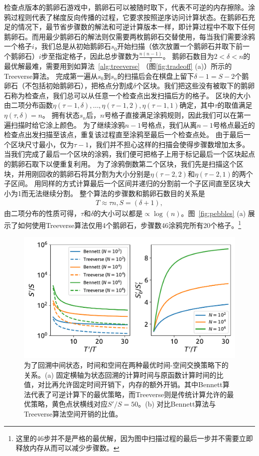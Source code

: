 \documentclass[A4,twoside,UTF8]{ctexart}
\begin{document}
检查点版本的鹅卵石游戏中，鹅卵石可以被随时取下，代表不可逆的内存擦除。涂鸦过程则代表了梯度反向传播的过程，它要求按照逆序访问计算状态。在鹅卵石充足的情况下，最节省步骤数的解法和可逆计算版本一样，即计算过程中不取下任何鹅卵石。而用最少鹅卵石的解法则仅需要两枚鹅卵石交替使用，每当我们需要涂鸦一个格子$i$，我们总是从初始鹅卵石$s_0$开始扫描（依次放置一个鹅卵石并取下前一个鹅卵石）$i$步至指定格子，因此总步骤数为$\frac{n(n-1)}{2}$。
鹅卵石数目为$2<\delta<n$的最优解最难，需要用到如算法~\ref{alg:treeverse} （图\ref{fig:tradeoff} (a)）所示的Treeverse算法。
完成第一遍从$s_0$到$s_{n}$的扫描后会在棋盘上留下$\delta-1=S-2$个鹅卵石（不包括初始鹅卵石），把格点分割成$\delta$个区块。我们把这些没有被取下的鹅卵石称为检查点，我们总可以从任意一个检查点出发扫描后方的格子。
区块的大小由二项分布函数$\eta(\tau-1, \delta), \ldots, \eta(\tau-1, 2), \eta(\tau-1, 1)$确定，其中$\tau$的取值满足$\eta(\tau, \delta) = n$。
拥有状态$s_{n}$后，$n$号格子直接满足涂鸦规则，因此我们可以在第一遍扫描时给它涂上颜色。
为了继续涂鸦$n-1$号格点，我们从离$n-1$号格点最近的检查点出发扫描至该点，重复该过程直至涂鸦至最后一个检查点处。
由于最后一个区块尺寸最小，仅为$\tau-1$，我们并不担心这样的扫描会使得步骤数增加太多。
当我们完成了最后一个区块的涂鸦，我们便可把格子上用于标记最后一个区块起点的鹅卵石取下以便重复利用。
为了涂鸦倒数第二个区块，我们先是扫描这个区块，并用刚回收的鹅卵石将其分割为大小分别是$\eta(\tau-2, 2)$和$\eta(\tau-2, 1)$的两个子区间。
用同样的方式计算最后一个区间并递归的分割前一个子区间直至区块大小为1而无法继续分割。
整个算法的步骤数和鹅卵石数目的关系是
\begin{align}
    T \approx \tau n, S = (\delta+1),
\end{align}
由二项分布的性质可得，$\tau$和$\delta$的大小可以都是$\propto\log(n)$。图~\ref{fig:pebbles} (a) 展示了如何使用Treeverse算法仅用4个鹅卵石，步骤数46涂鸦完所有20个格子。\footnote{这里的46步并不是严格的最优解，因为图中扫描过程的最后一步并不需要立即释放内存从而可以减少步骤数。}

\begin{figure}[h]
\centering
\includegraphics[width=0.8\columnwidth]{./fig1.pdf}
    \caption{为了回溯中间状态，时间和空间在两种最优时间-空间交换策略下的关系。(a) 固定横轴为状态回溯的计算时间与原函数计算时间的比值，对比再允许固定时间开销下，内存的额外开销。其中Bennett算法代表了可逆计算下的最优策略，而Treeverse则是传统计算允许的最优策略，黄色点状横线对应$S'/S=50$。(b) 对比Bennett算法与Treeverse算法空间开销的比值。\label{fig:timespace}}
\end{figure}
\end{document}
